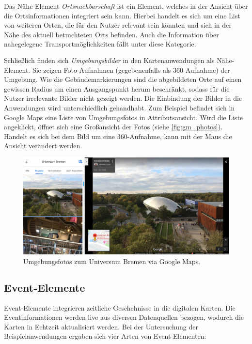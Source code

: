 Das Nähe-Element \emph{Ortsnachbarschaft} ist ein Element, welches in der Ansicht über die Ortsinformationen integriert sein kann.
Hierbei handelt es sich um eine List von weiteren Orten, die für den Nutzer relevant sein könnten und sich in der Nähe des aktuell betrachteten Orts befinden.
Auch die Information über nahegelegene Transportmöglichkeiten fällt unter diese Kategorie.

Schließlich finden sich \emph{Umgebungsbilder} in den Kartenanwendungen als Nähe-Element.
Sie zeigen Foto-Aufnahmen (gegebenenfalls als 360\textdegree-Aufnahme) der Umgebung.
Wie die Gebäudemarkierungen sind die abgebildeten Orte auf einen gewissen Radius um einen Ausgangspunkt herum beschränkt, sodass für die Nutzer irrelevante Bilder nicht gezeigt werden.
Die Einbindung der Bilder in die Anwendungen wird unterschiedlich gehandhabt.
Zum Beispiel befindet sich in Google Maps eine Liste von Umgebungsfotos in Attributsansicht.
Wird die Liste angeklickt, öffnet sich eine Großansicht der Fotos (siehe \autoref{fig:gm_photos}).
Handelt es sich bei dem Bild um eine 360\textdegree-Aufnahme, kann mit der Maus die Ansicht verändert werden.

\begin{figure}
	\centering
	\includegraphics[width=\linewidth]{figures/map-app_examples/gm_photos_2}
	\caption{Umgebungsfotos zum Universum Bremen via Google Maps.}
	\label{fig:gm_photos}
\end{figure}

\subsection{Event-Elemente}
\label{ssec:event-elements}
Event-Elemente integrieren zeitliche Geschehnisse in die digitalen Karten.
Die Eventinformationen werden live aus diversen Datenquellen bezogen, wodurch die Karten in Echtzeit aktualisiert werden.
Bei der Untersuchung der Beispielanwendungen ergaben sich vier Arten von Event-Elementen:

